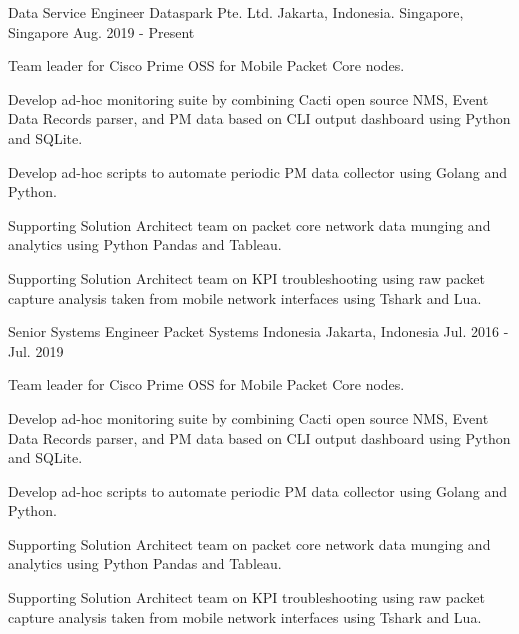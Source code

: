 

\begin{cventries}

\cventry
{Data Service Engineer} %
{Dataspark Pte. Ltd.} %
{Jakarta, Indonesia. Singapore, Singapore} %
{Aug. 2019 - Present} %
{
  \begin{cvitems} %
    \item {Team leader for Cisco Prime OSS for Mobile Packet Core nodes.}
    \item {Develop ad-hoc monitoring suite by combining Cacti open source NMS, Event Data Records parser, and PM data based on CLI output dashboard using Python and SQLite.}
    \item {Develop ad-hoc scripts to automate periodic PM data collector using Golang and Python.}
    \item {Supporting Solution Architect team on packet core network data munging and analytics using Python Pandas and Tableau.}
    \item {Supporting Solution Architect team on KPI troubleshooting using raw packet capture analysis taken from mobile network interfaces using Tshark and Lua.}
  \end{cvitems}
}

  \cventry
    {Senior Systems Engineer} %
    {Packet Systems Indonesia} %
    {Jakarta, Indonesia} %
    {Jul. 2016 - Jul. 2019} %
    {
      \begin{cvitems} %
        \item {Team leader for Cisco Prime OSS for Mobile Packet Core nodes.}
        \item {Develop ad-hoc monitoring suite by combining Cacti open source NMS, Event Data Records parser, and PM data based on CLI output dashboard using Python and SQLite.}
        \item {Develop ad-hoc scripts to automate periodic PM data collector using Golang and Python.}
        \item {Supporting Solution Architect team on packet core network data munging and analytics using Python Pandas and Tableau.}
        \item {Supporting Solution Architect team on KPI troubleshooting using raw packet capture analysis taken from mobile network interfaces using Tshark and Lua.}
      \end{cvitems}
    }


\end{cventries}
